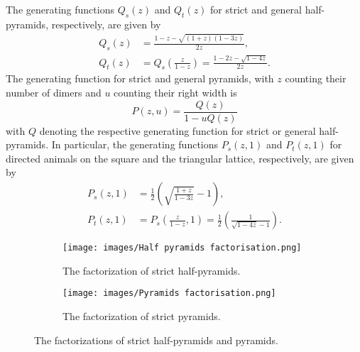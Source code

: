 \begin{theorem}\label{thm:gf_directed_animals}
  The generating functions $Q_s(z)$ and $Q_t(z)$ for strict and general half-pyramids, respectively, are given by
  \begin{align*}
    Q_s(z) &= \frac{1 - z - \sqrt{(1+z)(1-3z)}}{2z}, \\
    Q_t(z) &= Q_s\left(\frac{z}{1-z}\right) = \frac{1 - 2z - \sqrt{1 - 4z}}{2z}.
  \end{align*}
  The generating function for strict and general pyramids, with $z$ counting their number of dimers and $u$ counting their right width is
  \begin{equation} \label{eq:gf_pyramids}
    P(z,u) = \frac{Q(z)}{1 - uQ(z)}
  \end{equation}
  with $Q$ denoting the respective generating function for strict or general half-pyramids.
  In particular, the generating functions $P_s(z,1)$ and $P_t(z,1)$ for directed animals on the square and the triangular lattice, respectively, are given by
  \begin{align*}
    P_s(z,1) &= \frac{1}{2}\left(\sqrt{\frac{1+z}{1-3z}}-1\right), \\
    P_t(z,1) &= P_s\left(\frac{z}{1-z},1\right) = \frac{1}{2}\left(\frac{1}{\sqrt{1-4z} - 1}\right).
  \end{align*}
\end{theorem}

\begin{figure}[hbt!]
  \centering
  \begin{subfigure}{\textwidth}
    \texttt{[image: images/Half pyramids factorisation.png]}
    \caption{The factorization of strict half-pyramids.}
    \label{fig:factorisation_half_pyramids}
  \end{subfigure}
  \begin{subfigure}{\textwidth}
    \texttt{[image: images/Pyramids factorisation.png]}
    \caption{The factorization of strict pyramids.}
    \label{fig:factorisation_pyramids}
  \end{subfigure}
  \caption{The factorizations of strict half-pyramids and pyramids.}
  \label{fig:factorisation}
\end{figure}

